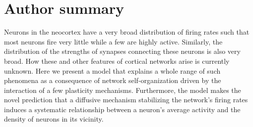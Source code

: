 \documentclass[10pt,letterpaper]{article}
\begin{document}
\section*{Author summary}
Neurons in the neocortex have a very broad distribution of firing rates such that most neurons fire very little while a few are highly active. Similarly, the distribution of the strengths of synapses connecting these neurons is also very broad. How these and other features of cortical networks arise is currently unknown. Here we present a model that explains a whole range of such phenomena as a consequence of network self-organization driven by the interaction of a few plasticity mechanisms. Furthermore, the model makes the novel prediction that a diffusive mechanism stabilizing the network's firing rates induces a systematic relationship between a neuron's average activity and the density of neurons in its vicinity.
\end{document}
